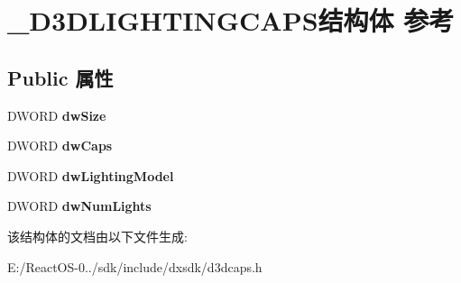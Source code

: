 \hypertarget{struct___d3_d_l_i_g_h_t_i_n_g_c_a_p_s}{}\section{\+\_\+\+D3\+D\+L\+I\+G\+H\+T\+I\+N\+G\+C\+A\+P\+S结构体 参考}
\label{struct___d3_d_l_i_g_h_t_i_n_g_c_a_p_s}
\subsection*{Public 属性}
\begin{DoxyCompactItemize}
\item 
\mbox{\label{struct___d3_d_l_i_g_h_t_i_n_g_c_a_p_s_a0a6c1e68040fa50bf88c5644eab9b897}} 
D\+W\+O\+RD {\bfseries dw\+Size}
\item 
\mbox{\label{struct___d3_d_l_i_g_h_t_i_n_g_c_a_p_s_a3bd567fdade36072401308d15e4ef234}} 
D\+W\+O\+RD {\bfseries dw\+Caps}
\item 
\mbox{\label{struct___d3_d_l_i_g_h_t_i_n_g_c_a_p_s_af9a6083bd888389c483b940aad19a627}} 
D\+W\+O\+RD {\bfseries dw\+Lighting\+Model}
\item 
\mbox{\label{struct___d3_d_l_i_g_h_t_i_n_g_c_a_p_s_a346cd3dea288dd260ff623cb241cad8e}} 
D\+W\+O\+RD {\bfseries dw\+Num\+Lights}
\end{DoxyCompactItemize}


该结构体的文档由以下文件生成\+:\begin{DoxyCompactItemize}
\item 
E\+:/\+React\+O\+S-\/0../sdk/include/dxsdk/d3dcaps.\+h\end{DoxyCompactItemize}
